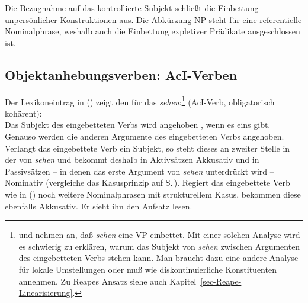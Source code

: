{Die Bezugnahme auf das kontrollierte Subjekt schließt die Einbettung unpersönlicher Konstruktionen aus.
Die Abkürzung NP steht für eine referentielle Nominalphrase, weshalb auch die Einbettung
expletiver Prädikate ausgeschlossen ist.





\subsection{Objektanhebungsverben: AcI-Verben}
%



Der Lexikoneintrag in () zeigt den \localw für das \aciv \emph{sehen}:\footnote{
        \citet[]{HM94a} und \citet[]{Suchsland97a} nehmen an,
        daß \emph{sehen} eine VP einbettet. Mit einer solchen Analyse wird
        es schwierig zu erklären, warum das Subjekt von \emph{sehen} zwischen
        Argumenten des eingebetteten Verbs stehen kann. Man braucht
        dazu eine andere Analyse für lokale Umstellungen
        oder muß wie \citet{Reape94a} diskontinuierliche Konstituenten
        annehmen. Zu Reapes Ansatz siehe auch Kapitel~\ref{sec-Reape-Linearisierung}.%
}
\eas
\label{le-sehen}
 (AcI-Verb, obligatorisch kohärent):\\
\zs{}
Das Subjekt des eingebetteten Verbs wird angehoben , wenn es eins gibt.
Genauso werden die anderen Argumente des eingebetteten Verbs  angehoben.
Verlangt das eingebettete Verb ein Subjekt, so steht dieses an zweiter Stelle in
der \subcatl von \emph{sehen} und bekommt deshalb in Aktivsätzen
Akkusativ und in Passivsätzen -- in denen das erste Argument von \emph{sehen} unterdrückt wird -- 
Nominativ (vergleiche das Kasusprinzip auf S.\,\pageref{case-p}). 
Regiert das eingebettete Verb wie in () noch weitere Nominalphrasen mit strukturellem Kasus, bekommen
diese ebenfalls Akkusativ.
\ea
Er sieht ihn den Aufsatz lesen.
\z

}
